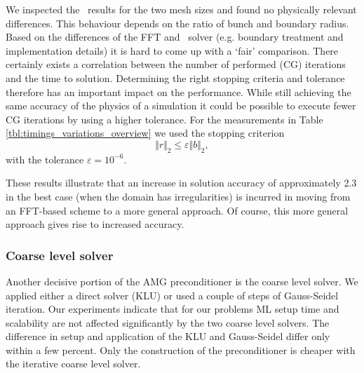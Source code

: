 
We inspected the \oursolver\ results for the two mesh sizes and found no
physically relevant differences. This behaviour depends on the ratio of
bunch and boundary radius.  Based on the differences of the FFT and
\oursolver\ solver (e.g. boundary treatment and implementation details)
it is hard to come up with a `fair' comparison.  There certainly exists
a correlation between the number of performed (CG) iterations and the
time to solution.  Determining the right stopping criteria and tolerance
therefore has an important impact on the performance.  While still
achieving the same accuracy of the physics of a simulation it could be
possible to execute fewer CG iterations by using a higher tolerance.
For the measurements in Table \ref{tbl:timings_variations_overview} we
used the stopping criterion
\begin{equation*}
  \Vert r \Vert_2 \le \varepsilon  {\Vert b \Vert_2},
\end{equation*}
with the tolerance $\varepsilon = 10^{-6}$.


These results illustrate that an increase in solution accuracy of approximately
2.3 in the best case (when the domain has irregularities) is incurred in moving
from an FFT-based scheme to a more general approach. Of course, this more
general approach gives rise to increased accuracy.

\subsubsection*{Coarse level solver}

Another decisive portion of the AMG preconditioner is the coarse level
solver.  We applied either a direct solver (KLU) or used a couple of
steps of Gauss-Seidel iteration.  
Our experiments indicate that for our problems ML setup time and scalability are
not affected significantly by the two coarse level solvers. The difference in
setup and application of the KLU and Gauss-Seidel  differ only within a few
percent. Only the construction of the preconditioner is cheaper with the
iterative coarse level solver.  


